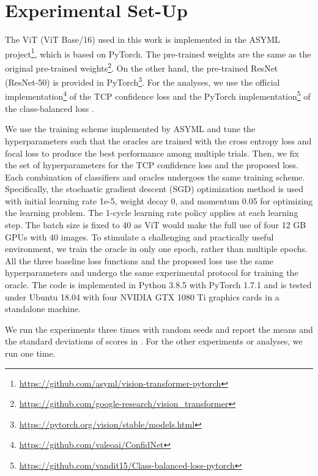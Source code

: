 \section{Experimental Set-Up}
\label{sec:implementation}
The ViT (\ie ViT Base/16) used in this work is implemented in the ASYML project\footnote{\url{https://github.com/asyml/vision-transformer-pytorch}}, which is based on PyTorch.
The pre-trained weights are the same as the original pre-trained weights\footnote{\url{https://github.com/google-research/vision_transformer}}.
On the other hand, the pre-trained ResNet (\ie ResNet-50) is provided in PyTorch\footnote{\url{https://pytorch.org/vision/stable/models.html}}.
For the analyses, we use the official implementation\footnote{\url{https://github.com/valeoai/ConfidNet}} of the TCP confidence loss \cite{Corbiere_NIPS_2019}
and the PyTorch implementation\footnote{\url{https://github.com/vandit15/Class-balanced-loss-pytorch}} of the class-balanced loss \cite{Cui_CVPR_2019}.

We use the training scheme implemented by ASYML and tune the hyperparameters such that the oracles are trained with the cross entropy loss and focal loss to produce the best performance among multiple trials. Then, we fix the set of hyperparameters for the TCP confidence loss and the proposed loss.
Each combination of classifiers and oracles undergoes the same training scheme.
Specifically, the stochastic gradient descent (SGD) optimization method is used with initial learning rate 1e-5, weight decay 0, and momentum 0.05 for optimizing the learning problem.
The 1-cycle learning rate policy applies at each learning step.
The batch size is fixed to 40 as ViT would make the full use of four 12 GB GPUs with 40 images.
To stimulate a challenging and practically useful environment, we train the oracle in only one epoch, rather than multiple epochs.
All the three baseline loss functions and the proposed loss use the same hyperparameters and undergo the same experimental protocol for training the oracle.
The code is implemented in Python 3.8.5 with PyTorch 1.7.1 \cite{Paszke_NIPS_2019} and is tested under Ubuntu 18.04 with four NVIDIA GTX 1080 Ti graphics cards in a standalone machine.

We run the experiments three times with random seeds and report the means and the standard deviations of scores in . For the other experiments or analyses, we run one time.

